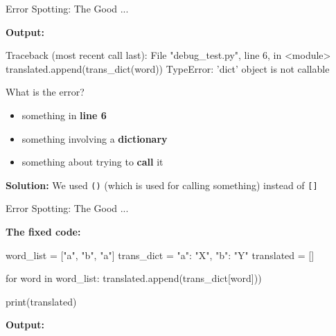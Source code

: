 \begin{frame}[fragile]{Error Spotting: The Good ...}

    \textbf{Output:}

    \begin{outputcode}
    Traceback (most recent call last):
      File "debug_test.py", line 6, in <module>
        translated.append(trans_dict(word))
    TypeError: 'dict' object is not callable
    \end{outputcode}

    \vspace{1em}

    What is the error?
    \begin{itemize}
        \item something in \textbf{line 6}
        \item something involving a \textbf{dictionary}
        \item something about trying to \textbf{call} it
    \end{itemize}

    \pause
    \vspace{1em}

    \textbf{Solution:} We used \texttt{()} (which is used for calling something) instead of \texttt{[]}


\end{frame}

\begin{frame}[fragile]{Error Spotting: The Good ...}

    \textbf{The fixed code:}

    \begin{pythoncode}
    word_list   = ["a", "b", "a"]
    trans_dict  = {"a": "X", "b": "Y"}
    translated  = []

    for word in word_list:
        translated.append(trans_dict[word]))

    print(translated)
    \end{pythoncode}

    \textbf{Output:}

    \begin{outputcode}
    ['X', 'Y', 'X']
    \end{outputcode}

\end{frame}


